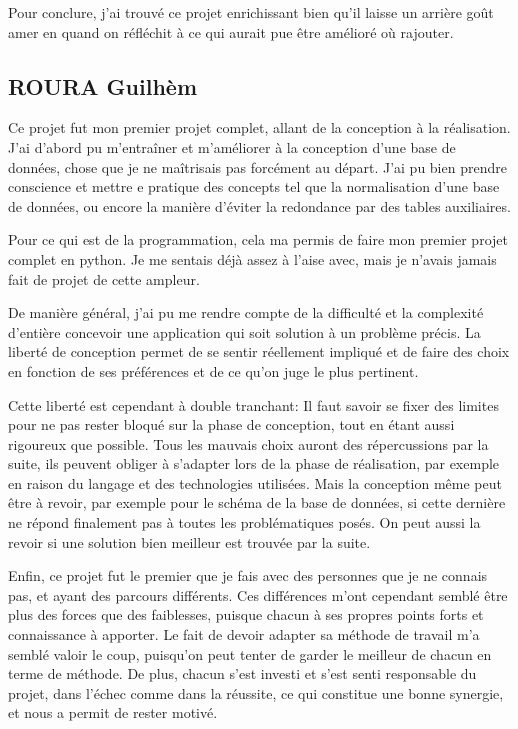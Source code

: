 Pour conclure, j'ai trouvé ce projet enrichissant bien qu'il laisse un arrière goût amer en quand on réfléchit à ce qui aurait pue être amélioré où rajouter.


\subsection{ROURA Guilhèm} Ce projet fut mon premier projet complet, allant de la conception à la réalisation.
J'ai d'abord pu m'entraîner et m'améliorer à la conception d'une base de données, chose que je ne maîtrisais pas forcément au départ.
J'ai pu bien prendre conscience et mettre e pratique des concepts tel que la normalisation d'une base de données, ou encore la manière d'éviter la redondance par des tables auxiliaires.

Pour ce qui est de la programmation, cela ma permis de faire mon premier projet complet en python.
Je me sentais déjà assez à l'aise avec, mais je n'avais jamais fait de projet de cette ampleur.

De manière général, j'ai pu me rendre compte de la difficulté et la complexité d'entière concevoir une application qui soit solution à un problème précis.
La liberté de conception permet de se sentir réellement impliqué et de faire des choix en fonction de ses préférences et de ce qu'on juge le plus pertinent.

Cette liberté est cependant à double tranchant: Il faut savoir se fixer des limites pour ne pas rester bloqué sur la phase de conception, tout en étant aussi rigoureux que possible. 
Tous les mauvais choix auront des répercussions par la suite, ils peuvent obliger à s'adapter lors de la phase de réalisation, par exemple en raison du langage et des technologies utilisées.
Mais la conception même peut être à revoir, par exemple pour le schéma de la base de données, si cette dernière ne répond finalement pas à toutes les problématiques posés.
On peut aussi la revoir si une solution bien meilleur est trouvée par la suite.


Enfin, ce projet fut le premier que je fais avec des personnes que je ne connais pas, et ayant des parcours différents.
Ces différences m'ont cependant semblé être plus des forces que des faiblesses, puisque chacun à ses propres points forts et connaissance à apporter.
Le fait de devoir adapter sa méthode de travail m'a semblé valoir le coup, puisqu'on peut tenter de garder le meilleur de chacun en terme de méthode.
De plus, chacun s'est investi et s'est senti responsable du projet, dans l'échec comme dans la réussite, ce qui constitue une bonne synergie, et nous a permit de rester motivé. 


